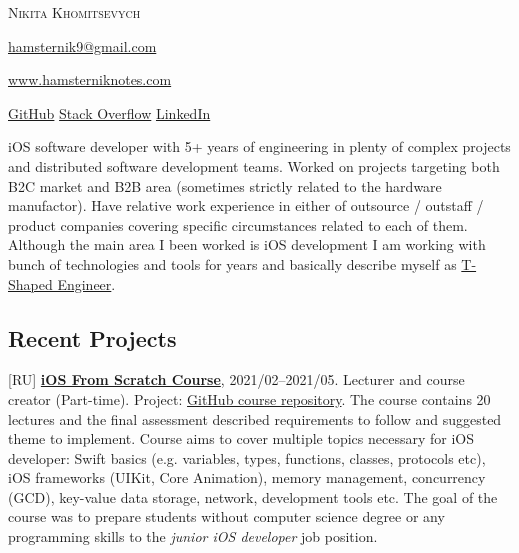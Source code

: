 \documentclass{nk-resume}
\begin{document}


\textsc{\huge{Nikita Khomitsevych}}

\vspace*{14px}

\href{mailto:hamsternik9@gmail.com}{hamsternik9@gmail.com} 

\href{https://hamsterniknotes.com}{www.hamsterniknotes.com}

\href{http://github.com/hamsternik}{\normalsize{GitHub}}
\hspace{2px}
\href{https://stackoverflow.com/users/3527499/hamsternik}{\normalsize{Stack Overflow}}
\hspace{2px}
\href{https://www.linkedin.com/in/khomitsevych/}{\normalsize{LinkedIn}} 

\vspace*{14px}

iOS software developer with 5+ years of engineering in plenty of complex projects and distributed 
software development teams. Worked on projects targeting both B2C market and B2B area (sometimes strictly 
related to the hardware manufactor). Have relative work experience in either of outsource / outstaff / product 
companies covering specific circumstances related to each of them. Although the main area I been worked is 
iOS development I am working with bunch of technologies and tools for years and basically describe myself 
as \href{https://alexkondov.com/the-t-shaped-engineer/}{T-Shaped Engineer}.


\subsection*{Recent Projects}

[RU] \textbf{\href{https://robotdreams.cc/course/ios-razrabotka-prilozheniy-s-0}{iOS From Scratch Course}}, 2021/02--2021/05.
\newline Lecturer and course creator (Part-time). Project: \href{https://github.com/hamsternik/robotdreams-ios-course}{GitHub course repository}.
\newline The course contains 20 lectures and the final assessment described requirements to follow and suggested theme to implement.
Course aims to cover multiple topics necessary for iOS developer:
Swift basics (e.g. variables, types, functions, classes, protocols etc), iOS frameworks (UIKit, Core Animation), 
memory management, concurrency (GCD), key-value data storage, network, development tools etc.
\newline The goal of the course was to prepare students without computer science degree or any programming skills to the \textit{junior iOS developer} job position.
\end{document}
